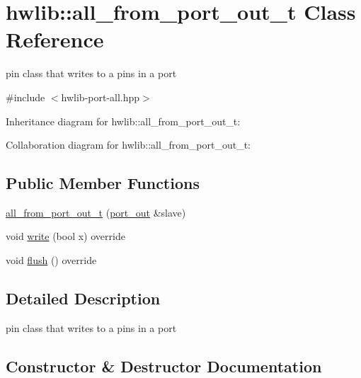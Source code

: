 \hypertarget{classhwlib_1_1all__from__port__out__t}{}\section{hwlib\+:\+:all\+\_\+from\+\_\+port\+\_\+out\+\_\+t Class Reference}
\label{classhwlib_1_1all__from__port__out__t}


pin class that writes to a pins in a port  




{\ttfamily \#include $<$hwlib-\/port-\/all.\+hpp$>$}



Inheritance diagram for hwlib\+:\+:all\+\_\+from\+\_\+port\+\_\+out\+\_\+t\+:


Collaboration diagram for hwlib\+:\+:all\+\_\+from\+\_\+port\+\_\+out\+\_\+t\+:
\subsection*{Public Member Functions}
\begin{DoxyCompactItemize}
\item 
\hyperlink{classhwlib_1_1all__from__port__out__t_acb149b2059c4f4ae102f1076eb7801a2}{all\+\_\+from\+\_\+port\+\_\+out\+\_\+t} (\hyperlink{classhwlib_1_1port__out}{port\+\_\+out} \&slave)
\item 
void \hyperlink{classhwlib_1_1all__from__port__out__t_ad062b586a43e257a4e7fa14ba3ce7d21}{write} (bool x) override
\item 
void \hyperlink{classhwlib_1_1all__from__port__out__t_aa98ee6cecc0f87b153f5aea8b2967f21}{flush} () override
\end{DoxyCompactItemize}


\subsection{Detailed Description}
pin class that writes to a pins in a port 

\subsection{Constructor \& Destructor Documentation}
\mbox{\label{classhwlib_1_1all__from__port__out__t_acb149b2059c4f4ae102f1076eb7801a2}} 

